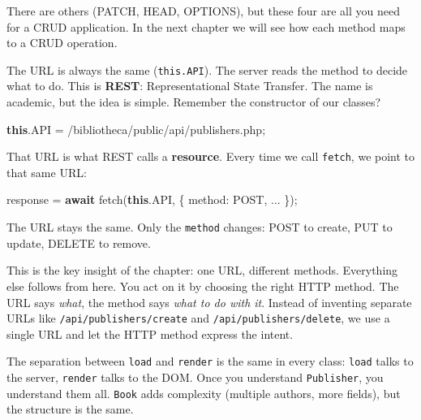 \documentclass[11pt,a4paper,oneside]{book}
\newenvironment{Shaded}{\begin{snugshade}}{\end{snugshade}}
\newcommand{\KeywordTok}[1]{\textcolor[HTML]{007020}{\textbf{#1}}}
\newcommand{\DataTypeTok}[1]{\textcolor[HTML]{902000}{#1}}
\newcommand{\StringTok}[1]{\textcolor[HTML]{4070A0}{#1}}
\newcommand{\FunctionTok}[1]{\textcolor[HTML]{06287E}{#1}}
\newcommand{\ControlFlowTok}[1]{\textcolor[HTML]{007020}{\textbf{#1}}}
\newcommand{\OperatorTok}[1]{\textcolor[HTML]{666666}{#1}}
\newcommand{\AttributeTok}[1]{\textcolor[HTML]{7D9029}{#1}}
\newcommand{\NormalTok}[1]{#1}
\begin{document}
There are others (PATCH, HEAD, OPTIONS), but these four are all
you need for a CRUD application. In the next chapter we will see
how each method maps to a CRUD operation.

The URL is always the same (\texttt{this.API}). The server reads
the method to decide what to do. This is \textbf{REST}:
Representational State Transfer. The name is academic, but the
idea is simple. Remember the constructor of our classes?

\begin{Shaded}
\begin{Highlighting}[]
\KeywordTok{this}\OperatorTok{.}\AttributeTok{API} \OperatorTok{=} \StringTok{\textquotesingle{}/bibliotheca/public/api/publishers.php\textquotesingle{}}\OperatorTok{;}
\end{Highlighting}
\end{Shaded}

That URL is what REST calls a \textbf{resource}. Every time we
call \texttt{fetch}, we point to that same URL:

\begin{Shaded}
\begin{Highlighting}[]
\NormalTok{response }\OperatorTok{=} \ControlFlowTok{await} \FunctionTok{fetch}\NormalTok{(}\KeywordTok{this}\OperatorTok{.}\AttributeTok{API}\OperatorTok{,}\NormalTok{ \{}
    \DataTypeTok{method}\OperatorTok{:} \StringTok{\textquotesingle{}POST\textquotesingle{}}\OperatorTok{,}
    \OperatorTok{...}
\NormalTok{\})}\OperatorTok{;}
\end{Highlighting}
\end{Shaded}

The URL stays the same. Only the \texttt{method} changes: POST to
create, PUT to update, DELETE to remove.

This is the key insight of the chapter: one URL, different
methods. Everything else follows from here. You act on it by
choosing the right HTTP method. The URL says \emph{what}, the
method says \emph{what to do with it}. Instead of inventing
separate URLs like \texttt{/api/publishers/create} and
\texttt{/api/publishers/delete}, we use a single URL and let the
HTTP method express the intent.

The separation between \texttt{load} and \texttt{render} is the
same in every class: \texttt{load} talks to the server,
\texttt{render} talks to the DOM. Once you understand
\texttt{Publisher}, you understand them all. \texttt{Book} adds
complexity (multiple authors, more fields), but the structure is
the same.
\end{document}
